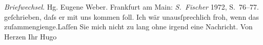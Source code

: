 \begin{ledgroupsized}[t]{13cm}
{{{                                \emph{Briefwechsel}. Hg. Eugene Weber. Frankfurt am
                            Main: \emph{S. Fischer}{ }1972, S. 76–77.}}}\label{K_L00818_1h} geſchrieben, daſs er mit uns
                    kommen ſoll. Ich wär unausſprechlich froh, wenn das zuſammengienge.\hspace*{2.5em}Laſſen Sie mich nicht zu lang ohne irgend eine
                    Nachricht. Von {\pb}Herzen
                    Ihr\pend
           \pstart \spacefill\mbox{Hugo}\pend{}
         
         \endnumbering{}\end{ledgroupsized}  \newcommand{\dateiname}{L00818}\newcommand{\titel}{Hugo von Hofmannsthal an Arthur Schnitzler, 12. 7. [1898]}\newcommand{\editorInnen}{Martin Anton Müller und Gerd-Hermann Susen}
      